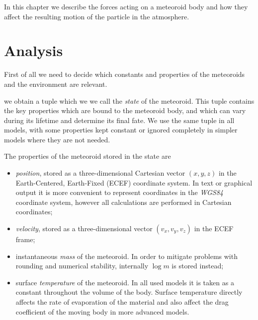 
In this chapter we describe the forces acting on a meteoroid body
and how they affect the resulting motion of the particle in the atmosphere.

\section{Analysis} \label{da}
    First of all we need to decide which constants and properties of the meteoroids
    and the environment are relevant.

    we obtain a tuple which we we call the \emph{state} of the meteoroid.
    This tuple contains the key properties which are bound to the meteoroid body,
    and which can vary during its lifetime and determine its final fate.
    We use the same tuple in all models, with some properties
    kept constant or ignored completely in simpler models where they are not needed.

    The properties of the meteoroid stored in the state are
    \begin{itemize}
        \item \emph{position}, stored as a three-dimensional Cartesian vector $(x, y, z)$
            in the Earth-Centered, Earth-Fixed (ECEF) coordinate system.
            In text or graphical output it is more convenient to represent
            coordinates in the \emph{WGS84} coordinate system, however
            all calculations are performed in Cartesian coordinates;
        \item \emph{velocity}, stored as a three-dimensional vector $(v_x, v_y, v_z)$
            in the ECEF frame;
        \item instantaneous \emph{mass} of the meteoroid. In order to mitigate
            problems with rounding and numerical stability, internally $\log m$
            is stored instead;
        \item surface \emph{temperature} of the meteoroid. In all used models
            it is taken as a constant throughout the volume of the body.
            Surface temperature directly affects the rate of evaporation of the material
            and also affect the drag coefficient of the moving body in more advanced models.
    \end{itemize}

